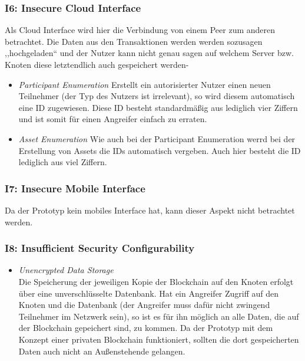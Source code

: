         \subsubsection*{I6: Insecure Cloud Interface}
            Als Cloud Interface wird hier die Verbindung von einem Peer zum anderen betrachtet.
            Die Daten aus den Transaktionen werden werden sozusagen ,,hochgeladen`` und der Nutzer kann nicht genau sagen auf welchem Server bzw. Knoten diese letztendlich auch gespeichert werden-
            \begin{itemize}[leftmargin=0cm,label={}]
                \item \emph{Participant Enumeration}\label{vuln:prototype_enum_part}
                    Erstellt ein autorisierter Nutzer einen neuen Teilnehmer (der Typ des Nutzers ist irrelevant), so wird diesem automatisch eine ID zugewiesen. 
                    Diese ID besteht standardmäßig aus lediglich vier Ziffern und ist somit für einen Angreifer einfach zu erraten.
                \item \emph{Asset Enumeration}\label{vuln:prototype_enum_asset}
                    Wie auch bei der Participant Enumeration werrd bei der Erstellung von Assets die IDs automatisch vergeben. 
                    Auch hier besteht die ID lediglich aus viel Ziffern.
            \end{itemize}
            
        \subsubsection*{I7: Insecure Mobile Interface}
            Da der Prototyp kein mobiles Interface hat, kann dieser Aspekt nicht betrachtet werden.
            
        \subsubsection*{I8: Insufficient Security Configurability}
            \begin{itemize}[leftmargin=0cm,label={}]
    	        \item \emph{Unencrypted Data Storage}\label{vuln:prototype_db}\\
                    Die Speicherung der jeweiligen Kopie der Blockchain auf den Knoten erfolgt über eine unverschlüsselte Datenbank. 
                    Hat ein Angreifer Zugriff auf den Knoten und die Datenbank (der Angreifer muss dafür nicht zwingend Teilnehmer im Netzwerk sein), so ist es für ihn möglich an alle Daten, die auf der Blockchain gepeichert sind, zu kommen. 
                    Da der Prototyp mit dem Konzept einer privaten Blockchain funktioniert, sollten die dort gespeicherten Daten auch nicht an Außenstehende gelangen.
            \end{itemize}
            
